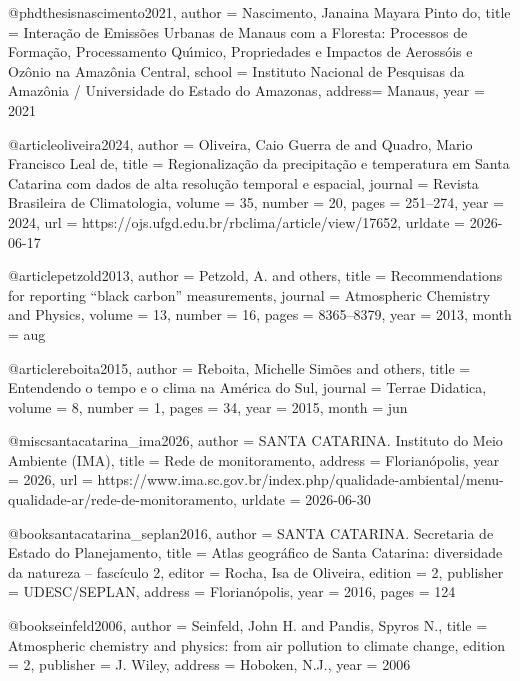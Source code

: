 @phdthesis{nascimento2021,
	author = {Nascimento, Janaina Mayara Pinto do},
	title  = {Intera{\c{c}}{\~a}o de Emiss{\~o}es Urbanas de Manaus com a Floresta: Processos de Forma{\c{c}}{\~a}o, Processamento Qu{\'\i}mico, Propriedades e Impactos de Aeross{\'o}is e Oz{\^o}nio na Amaz{\^o}nia Central},
	school = {Instituto Nacional de Pesquisas da Amaz{\^o}nia / Universidade do Estado do Amazonas},
	address= {Manaus},
	year   = {2021}
}

@article{oliveira2024,
	author  = {Oliveira, Caio Guerra de and Quadro, Mario Francisco Leal de},
	title   = {Regionaliza{\c{c}}{\~a}o da precipita{\c{c}}{\~a}o e temperatura em Santa Catarina com dados de alta resolu{\c{c}}{\~a}o temporal e espacial},
	journal = {Revista Brasileira de Climatologia},
	volume  = {35},
	number  = {20},
	pages   = {251--274},
	year    = {2024},
	url     = {https://ojs.ufgd.edu.br/rbclima/article/view/17652},
	urldate = {2026-06-17}
}

@article{petzold2013,
	author  = {Petzold, A. and others},
	title   = {Recommendations for reporting ``black carbon'' measurements},
	journal = {Atmospheric Chemistry and Physics},
	volume  = {13},
	number  = {16},
	pages   = {8365--8379},
	year    = {2013},
	month   = {aug}
}

@article{reboita2015,
	author  = {Reboita, Michelle Sim{\~o}es and others},
	title   = {Entendendo o tempo e o clima na Am{\'e}rica do Sul},
	journal = {Terrae Didatica},
	volume  = {8},
	number  = {1},
	pages   = {34},
	year    = {2015},
	month   = {jun}
}

@misc{santacatarina_ima2026,
	author       = {{SANTA CATARINA. Instituto do Meio Ambiente (IMA)}},
	title        = {Rede de monitoramento},
	address      = {Florianópolis},
	year         = {2026},
	url          = {https://www.ima.sc.gov.br/index.php/qualidade-ambiental/menu-qualidade-ar/rede-de-monitoramento},
	urldate      = {2026-06-30}
}

@book{santacatarina_seplan2016,
	author    = {{SANTA CATARINA. Secretaria de Estado do Planejamento}},
	title     = {Atlas geográfico de Santa Catarina: diversidade da natureza -- fascículo 2},
	editor    = {Rocha, Isa de Oliveira},
	edition   = {2},
	publisher = {UDESC/SEPLAN},
	address   = {Florianópolis},
	year      = {2016},
	pages     = {124}
}

@book{seinfeld2006,
	author    = {Seinfeld, John H. and Pandis, Spyros N.},
	title     = {Atmospheric chemistry and physics: from air pollution to climate change},
	edition   = {2},
	publisher = {J. Wiley},
	address   = {Hoboken, N.J.},
	year      = {2006}
}


